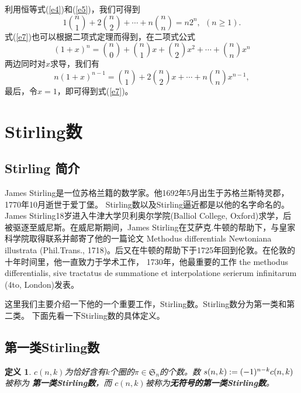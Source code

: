 \documentclass[a4paper,11pt,twoside]{book}
\newtheorem{defi}[thm]{定义}
\begin{document}
利用恒等式(\ref{e4})和(\ref{e5})，我们可得到
\begin{equation}\label{e7}
1{n\choose 1}+2{n\choose 2}+\cdots+n{n \choose n}=n2^n,\ \ (n\geq
1).
\end{equation}
式(\ref{e7})也可以根据二项式定理而得到，在二项式公式
$$(1+x)^n={n\choose 0}+{n\choose 1}x+{n\choose 2}x^2+\cdots+{n\choose n}x^n$$
两边同时对$x$求导，我们有
$$n(1+x)^{n-1}={n\choose 1}+2{n\choose 2}x+\cdots+n{n\choose n}x^{n-1},$$
最后，令$x=1$，即可得到式(\ref{e7})。





\section{Stirling数}

\subsection{Stirling 简介} James
Stirling是一位苏格兰籍的数学家。他1692年5月出生于苏格兰斯特灵郡，1770年10月逝世于爱丁堡。
Stirling数以及Stirling逼近都是以他的名字命名的。James
Stirling18岁进入牛津大学贝利奥尔学院(Balliol College,
Oxford)求学，后被驱逐至威尼斯。在威尼斯期间，James
Stirling在艾萨克.牛顿的帮助下，与皇家科学院取得联系并邮寄了他的一篇论文
Methodus differentials Newtoniana illustrata (Phil.Trans.,
1718)。后又在牛顿的帮助下于1725年回到伦敦。在伦敦的十年时间里，他一直致力于学术工作，
1730年，他最重要的工作 the methodus differentialis, sive tractatus
de summatione et interpolatione serierum infinitarum (4to,
London)发表。

这里我们主要介绍一下他的一个重要工作，Stirling数。Stirling数分为第一类和第二类。
下面先看一下Stirling数的具体定义。

\subsection{第一类Stirling数}

\begin{defi}
$c(n,k)$为恰好含有$k$个圈的$\pi\in\mathfrak{S}_n$的个数。数
$s(n,k):=(-1)^{n-k}\\c(n,k)$被称为{\bf
第一类Stirling数}，而 $c(n,k)$被称为{\bf 无符号的第一类Stirling数}。
\end{defi}
\end{document}
